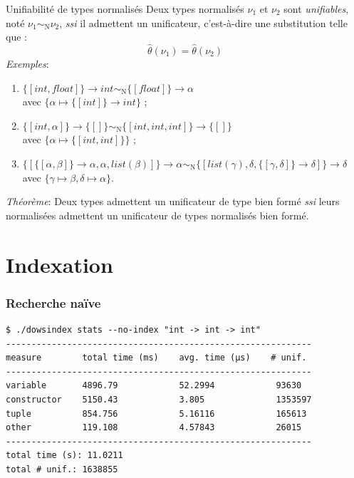 \documentclass[serif]{beamer}
\newcommand{\exemples}{\textit{Exemples}\xspace}
\newcommand{\theoreme}{\textit{Théorème}\xspace}
\newcommand{\mset}[1]{\{\![#1]\!\}}
\newcommand{\ssi}{\textit{ssi}\xspace}
\newcommand{\N}{\mathrm{N}}
\begin{document}
\begin{frame}{Unifiabilité de types normalisés}
\footnotesize
Deux types normalisés $\nu_1$ et $\nu_2$ sont \emph{unifiables}, noté $\nu_1 \sim_\N \nu_2$, \ssi il admettent un unificateur, c'est-à-dire une substitution telle que :
\[ \hat\theta (\nu_1) = \hat\theta (\nu_2) \]
\exemples :
\begin{enumerate}
	\item $\mset{int, float} \rightarrow int \sim_\N \mset{float} \rightarrow \alpha$ \\ avec $\{ \alpha \mapsto \mset{int} \rightarrow int \}$ ;
	\item $\mset{int, \alpha} \rightarrow \mset{} \sim_\N \mset{int, int, int} \rightarrow \mset{}$ \\ avec $\{ \alpha \mapsto \mset{int, int} \}$ ;
	\item $\mset{\mset{\alpha, \beta} \rightarrow \alpha, \alpha, list (\beta)} \rightarrow \alpha \sim_\N \mset{list (\gamma), \delta, \mset{\gamma, \delta} \rightarrow \delta} \rightarrow \delta$ \\ avec $\{ \gamma \mapsto \beta, \delta \mapsto \alpha \}$.
\end{enumerate}
\bigskip
\theoreme : Deux types admettent un unificateur de type bien formé \ssi leurs normalisées admettent un unificateur de types normalisés bien formé.
\end{frame}


\section{Indexation}


\begin{frame}[fragile=singleslide]\frametitle{Recherche naïve}
\footnotesize
\begin{verbatim}
$ ./dowsindex stats --no-index "int -> int -> int"
------------------------------------------------------------
measure        total time (ms)    avg. time (µs)    # unif.
------------------------------------------------------------
variable       4896.79            52.2994            93630
constructor    5150.43            3.805              1353597
tuple          854.756            5.16116            165613
other          119.108            4.57843            26015
------------------------------------------------------------
total time (s): 11.0211
total # unif.: 1638855
\end{verbatim}
\end{frame}
\end{document}
